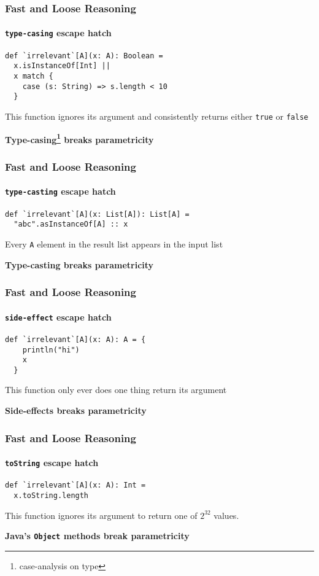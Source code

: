 \begin{frame}[fragile]
\frametitle{Fast and Loose Reasoning}
\framesubtitle{\lstinline{type-casing} escape hatch}
\begin{lstlisting}[style=scala]
def `irrelevant`[A](x: A): Boolean = 
  x.isInstanceOf[Int] ||
  x match {
    case (s: String) => s.length < 10
  }
\end{lstlisting}
\begin{theorem}This function ignores its argument and consistently returns either \lstinline{true} or \lstinline{false}\end{theorem}
\textbf{Type-casing\footnote{case-analysis on type} breaks parametricity}
\end{frame}

\begin{frame}[fragile]
\frametitle{Fast and Loose Reasoning}
\framesubtitle{\lstinline{type-casting} escape hatch}
\begin{lstlisting}[style=scala]
def `irrelevant`[A](x: List[A]): List[A] = 
  "abc".asInstanceOf[A] :: x  
\end{lstlisting}
\begin{theorem}Every \lstinline{A} element in the result list appears in the input list\end{theorem}
\textbf{Type-casting breaks parametricity}
\end{frame}

\begin{frame}[fragile]
\frametitle{Fast and Loose Reasoning}
\framesubtitle{\lstinline{side-effect} escape hatch}
\begin{lstlisting}[style=scala]
def `irrelevant`[A](x: A): A = {
    println("hi")
    x
  }
\end{lstlisting}
\begin{theorem}This function only ever does one thing \textemdash return its argument \end{theorem}
\textbf{Side-effects breaks parametricity}
\end{frame}

\begin{frame}[fragile]
\frametitle{Fast and Loose Reasoning}
\framesubtitle{\lstinline{toString} escape hatch}
\begin{lstlisting}[style=scala]
def `irrelevant`[A](x: A): Int =
  x.toString.length
\end{lstlisting}
\begin{theorem}This function ignores its argument to return one of {${2^{32}}$} values. \end{theorem}
\textbf{Java's \lstinline$Object$ methods break parametricity}
\end{frame}

